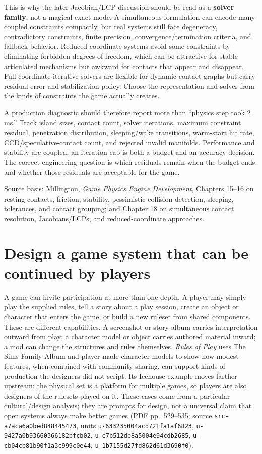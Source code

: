 This is why the later Jacobian/LCP discussion should be read as a \textbf{solver family}, not a magical exact mode. A simultaneous formulation can encode many coupled constraints compactly, but real systems still face degeneracy, contradictory constraints, finite precision, convergence/termination criteria, and fallback behavior. Reduced-coordinate systems avoid some constraints by eliminating forbidden degrees of freedom, which can be attractive for stable articulated mechanisms but awkward for contacts that appear and disappear. Full-coordinate iterative solvers are flexible for dynamic contact graphs but carry residual error and stabilization policy. Choose the representation and solver from the kinds of constraints the game actually creates.

A production diagnostic should therefore report more than ``physics step took 2 ms.'' Track island sizes, contact count, solver iterations, maximum constraint residual, penetration distribution, sleeping/wake transitions, warm-start hit rate, CCD/speculative-contact count, and rejected invalid manifolds. Performance and stability are coupled: an iteration cap is both a budget and an accuracy decision. The correct engineering question is which residuals remain when the budget ends and whether those residuals are acceptable for the game.

Source basis: Millington, \emph{Game Physics Engine Development}, Chapters 15--16 on resting contacts, friction, stability, pessimistic collision detection, sleeping, tolerances, and contact grouping; and Chapter 18 on simultaneous contact resolution, Jacobians/LCPs, and reduced-coordinate approaches.

\section{Design a game system that can be continued by players}\label{06-engine-ii-ch046-design-a-game-system-that-can-be-continued-by-players}

A game can invite participation at more than one depth. A player may simply play the supplied rules, tell a story about a play session, create an object or character that enters the game, or build a new ruleset from shared components. These are different capabilities. A screenshot or story album carries interpretation outward from play; a character model or object carries authored material inward; a mod can change the structures and rules themselves. \emph{Rules of Play} uses The Sims Family Album and player-made character models to show how modest features, when combined with community sharing, can support kinds of production the designers did not script. Its Icehouse example moves farther upstream: the physical set is a platform for multiple games, so players are also designers of the rulesets played on it. These cases come from a particular cultural/design analysis; they are prompts for design, not a universal claim that open systems always make better games (PDF pp.~529--535; source \texttt{src-a7aca6a0bed848445473}, units \texttt{u-633235004acd721fa1af6823}, \texttt{u-9427a0b93660366182bfcb02}, \texttt{u-e7b512db8a5004e94cdb2685}, \texttt{u-cb04cb81b90f1a3c999c0e44}, \texttt{u-1b7155d27fd862d61d3690f0}).


